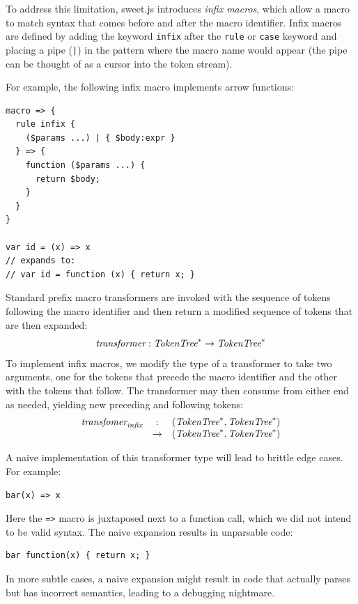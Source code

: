 \documentclass[preprint,10pt]{sigplanconf}
\begin{document}
To address this limitation, sweet.js introduces \emph{infix macros},
which allow a macro to match syntax that comes before and after the macro
identifier. Infix macros are defined by adding the keyword
\verb!infix! after the \verb!rule! or \verb!case!
keyword and placing a pipe (\verb!|!) in the pattern where the
macro name would appear (the pipe can be thought of as a cursor into
the token stream).

For example, the following infix macro implements arrow functions:
\begin{lstlisting}
macro => {
  rule infix {
    ($params ...) | { $body:expr }
  } => {
    function ($params ...) {
      return $body; 
    }
  }
}

var id = (x) => x
// expands to:
// var id = function (x) { return x; }
\end{lstlisting}


Standard prefix macro transformers are invoked with the sequence of
tokens following the macro identifier and then return a modified
sequence of tokens that are then expanded:
\[
\textit{transformer} : \textit{TokenTree}^* \rightarrow \textit{TokenTree}^*
\]
To implement infix macros, we modify the type of a transformer to
take two arguments, one for the tokens that precede the macro
identifier and the other with the tokens that follow. The transformer
may then consume from either end as needed, yielding new preceding
and following tokens:
\[
\begin{array}{rcl}
  \textit{transfomer}_{\textit{infix}} &:& (\textit{TokenTree}^*, \textit{TokenTree}^*) 
  \\
  &\rightarrow& (\textit{TokenTree}^*, \textit{TokenTree}^*)
\end{array}
\]

A naive implementation of this transformer type will lead to brittle
edge cases. For example:
\begin{lstlisting}
bar(x) => x
\end{lstlisting}
Here the \verb!=>! macro is juxtaposed next to a function call,
which we did not intend to be valid syntax. The naive expansion results
in unparsable code:
\begin{lstlisting}
bar function(x) { return x; }
\end{lstlisting}

In more subtle cases, a naive expansion might result in code that
actually parses but has incorrect semantics, leading to a
debugging nightmare.
\end{document}
